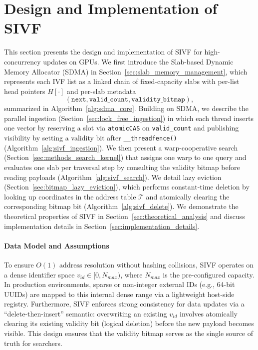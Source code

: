 \documentclass[sigconf,nonacm]{acmart}
\newcommand{\don}[1]{\textcolor{blue}{[Dongfang: #1]}}
\theoremstyle{plain}
\theoremstyle{definition}
\theoremstyle{remark}
\begin{document}
\section{Design and Implementation of SIVF}
\label{sec:design_implementation}



This section presents the design and implementation of SIVF for high-concurrency updates on GPUs. We first introduce the Slab-based Dynamic
Memory Allocator (SDMA) in Section~\ref{sec:slab_memory_management}, which represents each IVF list as a linked chain of fixed-capacity
slabs with per-list head pointers $H[\cdot]$ and per-slab metadata 
\[(\texttt{next}, \texttt{valid\_count}, \texttt{validity\_bitmap}),\]
summarized in Algorithm~\ref{alg:sdma_core}. Building on SDMA, we describe the parallel ingestion (Section~\ref{sec:lock_free_ingestion})
in which each thread inserts one vector by reserving a slot via \texttt{atomicCAS} on \texttt{valid\_count} and publishing visibility
by setting a validity bit after \verb|__threadfence()| (Algorithm~\ref{alg:sivf_ingestion}). We then present a warp-cooperative search (Section~\ref{sec:methods_search_kernel}) that assigns one warp to one query and evaluates one slab per traversal step by
consulting the validity bitmap before reading payloads (Algorithm~\ref{alg:sivf_search}). We detail lazy eviction
(Section~\ref{sec:bitmap_lazy_eviction}), which performs constant-time deletion by looking up coordinates in the address table
$\mathcal{T}$ and atomically clearing the corresponding bitmap bit (Algorithm~\ref{alg:sivf_delete}).
We demonstrate the theoretical properties of SIVF in Section~\ref{sec:theoretical_analysis} and discuss implementation details in Section~\ref{sec:implementation_details}.

\paragraph{Data Model and Assumptions}
To ensure $O(1)$ address resolution without hashing collisions, SIVF operates on a dense identifier space $v_{id} \in [0, N_{max})$, where $N_{max}$ is the pre-configured capacity. In production environments, sparse or non-integer external IDs (e.g., 64-bit UUIDs) are mapped to this internal dense range via a lightweight host-side registry. Furthermore, SIVF enforces strong consistency for data updates via a ``delete-then-insert'' semantic: overwriting an existing $v_{id}$ involves atomically clearing its existing validity bit (logical deletion) before the new payload becomes visible. This design ensures that the validity bitmap serves as the single source of truth for searchers.
\end{document}
